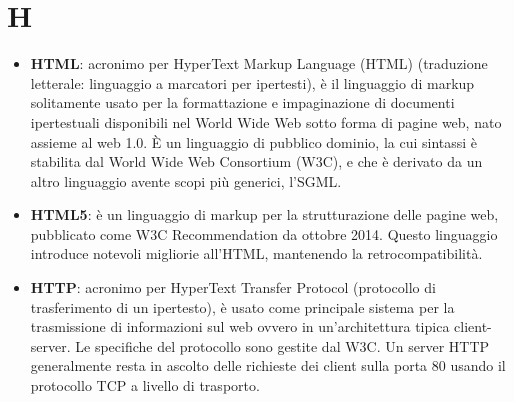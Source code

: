\section{H}
\begin{itemize} 
	\item \textbf{HTML}: acronimo per HyperText Markup Language (HTML) (traduzione letterale: linguaggio a marcatori per ipertesti), è il linguaggio di markup solitamente usato per la formattazione e impaginazione di documenti ipertestuali disponibili nel World Wide Web sotto forma di pagine web, nato assieme al web 1.0. È un linguaggio di pubblico dominio, la cui sintassi è stabilita dal World Wide Web Consortium (W3C), e che è derivato da un altro linguaggio avente scopi più generici, l'SGML. 
	\item \textbf{HTML5}: è un linguaggio di markup per la strutturazione delle pagine web, pubblicato come W3C Recommendation da ottobre 2014. Questo linguaggio introduce notevoli migliorie all'HTML, mantenendo la retrocompatibilità.
	\item \textbf{HTTP}: acronimo per HyperText Transfer Protocol (protocollo di trasferimento di un ipertesto), è usato come principale sistema per la trasmissione di informazioni sul web ovvero in un'architettura tipica client-server. Le specifiche del protocollo sono gestite dal W3C. Un server HTTP generalmente resta in ascolto delle richieste dei client sulla porta 80 usando il protocollo TCP a livello di trasporto.
\end{itemize}
